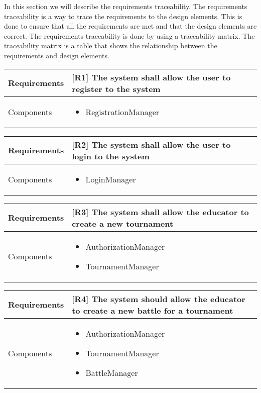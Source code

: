 In this section we will describe the requirements traceability. The requirements traceability is a way to trace the requirements to the design elements. This is done to ensure that all the requirements are met and that the design elements are correct. The requirements traceability is done by using a traceability matrix. The traceability matrix is a table that shows the relationship between the requirements and design elements. \\

\begin{tabular}{|p{3cm}|p{10cm}|}
    \hline
    Requirements & [R1] The system shall allow the user to register to the system \\
    \hline
    Components & 
    \begin{itemize}
        \item RegistrationManager
    \end{itemize} 
    \\
    \hline
\end{tabular}

\begin{tabular}{|p{3cm}|p{10cm}|}
    \hline
    Requirements & [R2] The system shall allow the user to login to the system \\
    \hline
    Components & 
    \begin{itemize}
        \item LoginManager
    \end{itemize} 
    \\
    \hline
\end{tabular}

\begin{tabular}{|p{3cm}|p{10cm}|}
    \hline
    Requirements & [R3] The system shall allow the educator to create a new tournament \\
    \hline
    Components & 
    \begin{itemize}
        \item AuthorizationManager
        \item TournamentManager
    \end{itemize} 
    \\
    \hline
\end{tabular}

\begin{tabular}{|p{3cm}|p{10cm}|}
    \hline
    Requirements & [R4] The system should allow the educator to create a new battle for a tournament \\
    \hline
    Components & 
    \begin{itemize}
        \item AuthorizationManager
        \item TournamentManager
        \item BattleManager
    \end{itemize} 
    \\
    \hline
\end{tabular}

